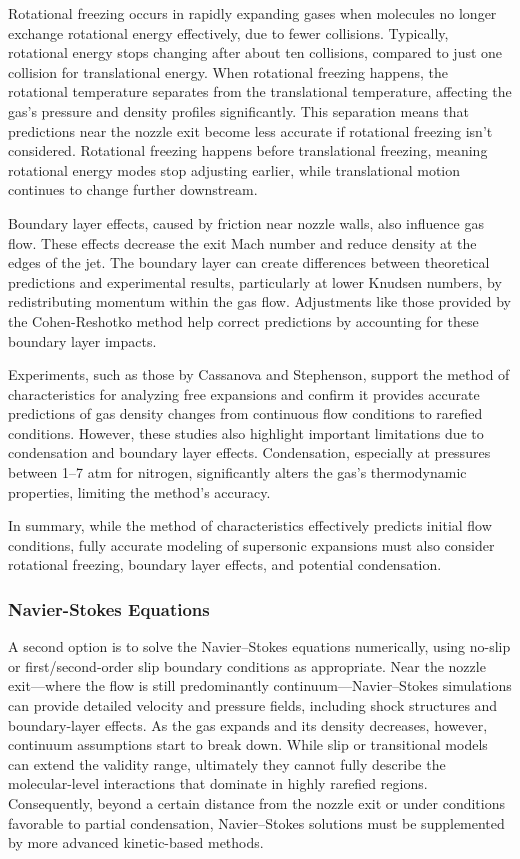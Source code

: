 		Rotational freezing occurs in rapidly expanding gases when molecules no longer exchange rotational energy effectively, due to fewer collisions.
		Typically, rotational energy stops changing after about ten collisions, compared to just one collision for translational energy.
		When rotational freezing happens, the rotational temperature separates from the translational temperature, affecting the gas's pressure and density profiles significantly.
		This separation means that predictions near the nozzle exit become less accurate if rotational freezing isn't considered.
		Rotational freezing happens before translational freezing, meaning rotational energy modes stop adjusting earlier, while translational motion continues to change further downstream.

		Boundary layer effects, caused by friction near nozzle walls, also influence gas flow.
		These effects decrease the exit Mach number and reduce density at the edges of the jet.
		The boundary layer can create differences between theoretical predictions and experimental results, particularly at lower Knudsen numbers, by redistributing momentum within the gas flow.
		Adjustments like those provided by the Cohen-Reshotko method help correct predictions by accounting for these boundary layer impacts.

		Experiments, such as those by Cassanova and Stephenson, support the method of characteristics for analyzing free expansions and confirm it provides accurate predictions of gas density changes from continuous flow conditions to rarefied conditions.
		However, these studies also highlight important limitations due to condensation and boundary layer effects.
		Condensation, especially at pressures between 1–7 atm for nitrogen, significantly alters the gas's thermodynamic properties, limiting the method's accuracy.

		In summary, while the method of characteristics effectively predicts initial flow conditions, fully accurate modeling of supersonic expansions must also consider rotational freezing, boundary layer effects, and potential condensation.
		\cite{jousten_handbook_2016, robertson_investigation_1970, noauthor_zucrow_nodate}

\subsubsection*{Navier-Stokes Equations}
	A second option is to solve the Navier–Stokes equations numerically, using no-slip or first/second-order slip boundary conditions as appropriate.
	Near the nozzle exit—where the flow is still predominantly continuum—Navier–Stokes simulations can provide detailed velocity and pressure fields, including shock structures and boundary-layer effects.
	As the gas expands and its density decreases, however, continuum assumptions start to break down.
	While slip or transitional models can extend the validity range, ultimately they cannot fully describe the molecular-level interactions that dominate in highly rarefied regions.
	Consequently, beyond a certain distance from the nozzle exit or under conditions favorable to partial condensation, Navier–Stokes solutions must be supplemented by more advanced kinetic-based methods.
	\cite{anderson_fundamentals_2017, anderson2021modern}

